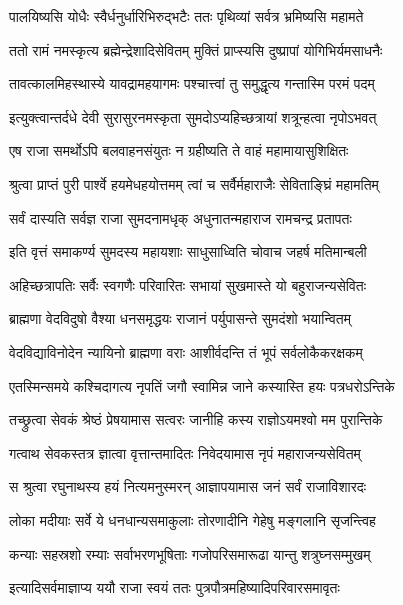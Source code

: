 \twolineshloka
{पालयिष्यसि योधैः स्वैर्धनुर्धारिभिरुद्भटैः}
{ततः पृथिव्यां सर्वत्र भ्रमिष्यसि महामते}%

\twolineshloka
{ततो रामं नमस्कृत्य ब्रह्मेन्द्रेशादिसेवितम्}
{मुक्तिं प्राप्स्यसि दुष्प्रापां योगिभिर्यमसाधनैः}%

\twolineshloka
{तावत्कालमिहस्थास्ये यावद्रामहयागमः}
{पश्चात्त्वां तु समुद्धृत्य गन्तास्मि परमं पदम्}%

\twolineshloka
{इत्युक्त्वान्तर्दधे देवी सुरासुरनमस्कृता}
{सुमदोऽप्यहिच्छत्रायां शत्रून्हत्वा नृपोऽभवत्}%

\twolineshloka
{एष राजा समर्थोऽपि बलवाहनसंयुतः}
{न ग्रहीष्यति ते वाहं महामायासुशिक्षितः}%

\twolineshloka
{श्रुत्वा प्राप्तं पुरी पार्श्वे हयमेधहयोत्तमम्}
{त्वां च सर्वैर्महाराजैः सेविताङ्घ्रिं महामतिम्}%

\twolineshloka
{सर्वं दास्यति सर्वज्ञ राजा सुमदनामधृक्}
{अधुनातन्महाराज रामचन्द्र प्रतापतः}%


\twolineshloka
{इति वृत्तं समाकर्ण्य सुमदस्य महायशाः}
{साधुसाध्विति चोवाच जहर्ष मतिमान्बली}%

\twolineshloka
{अहिच्छत्रापतिः सर्वैः स्वगणैः परिवारितः}
{सभायां सुखमास्ते यो बहुराजन्यसेवितः}%

\twolineshloka
{ब्राह्मणा वेदविदुषो वैश्या धनसमृद्धयः}
{राजानं पर्युपासन्ते सुमदंशो भयान्वितम्}%

\twolineshloka
{वेदविद्याविनोदेन न्यायिनो ब्राह्मणा वराः}
{आशीर्वदन्ति तं भूपं सर्वलोकैकरक्षकम्}%

\twolineshloka
{एतस्मिन्समये कश्चिदागत्य नृपतिं जगौ}
{स्वामिन्न जाने कस्यास्ति हयः पत्रधरोऽन्तिके}%

\twolineshloka
{तच्छ्रुत्वा सेवकं श्रेष्ठं प्रेषयामास सत्वरः}
{जानीहि कस्य राज्ञोऽयमश्वो मम पुरान्तिके}%

\twolineshloka
{गत्वाथ सेवकस्तत्र ज्ञात्वा वृत्तान्तमादितः}
{निवेदयामास नृपं महाराजन्यसेवितम्}%

\twolineshloka
{स श्रुत्वा रघुनाथस्य हयं नित्यमनुस्मरन्}
{आज्ञापयामास जनं सर्वं राजाविशारदः}%

\twolineshloka
{लोका मदीयाः सर्वे ये धनधान्यसमाकुलाः}
{तोरणादीनि गेहेषु मङ्गलानि सृजन्त्विह}%

\twolineshloka
{कन्याः सहस्रशो रम्याः सर्वाभरणभूषिताः}
{गजोपरिसमारूढा यान्तु शत्रुघ्नसम्मुखम्}%

\twolineshloka
{इत्यादिसर्वमाज्ञाप्य ययौ राजा स्वयं ततः}
{पुत्रपौत्रमहिष्यादिपरिवारसमावृतः}%

